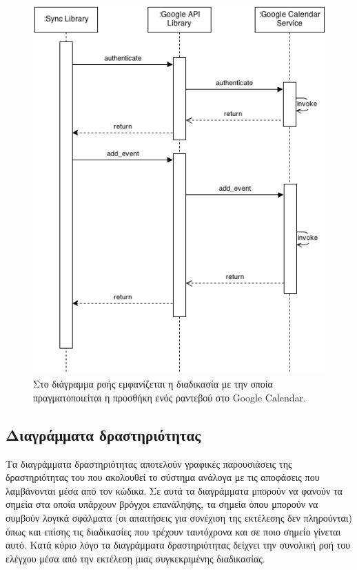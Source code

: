 \begin{figure}
\centering
\includegraphics[width=150mm]{images/sd-sync-appointment.png}
\caption{Στο διάγραμμα ροής εμφανίζεται η διαδικασία με την οποία πραγματοποιείται η προσθήκη ενός ραντεβού στο Google Calendar.}
\label{sd-save-appointment}
\end{figure}

\subsection{Διαγράμματα δραστηριότητας}
Τα διαγράμματα δραστηριότητας αποτελούν γραφικές παρουσιάσεις της δραστηριότητας του που ακολουθεί το σύστημα ανάλογα με τις αποφάσεις που λαμβάνονται μέσα από τον κώδικα. Σε αυτά τα διαγράμματα μπορούν να φανούν τα σημεία στα οποία υπάρχουν βρόγχοι επανάληψης, τα σημεία όπου μπορούν να συμβούν λογικά σφάλματα (οι απαιτήσεις για συνέχιση της εκτέλεσης δεν πληρούνται) όπως και επίσης τις διαδικασίες που τρέχουν ταυτόχρονα και σε ποιο σημείο γίνεται αυτό. Κατά κύριο λόγο τα διαγράμματα δραστηριότητας δείχνει την συνολική ροή του ελέγχου μέσα από την εκτέλεση μιας συγκεκριμένης διαδικασίας. 

